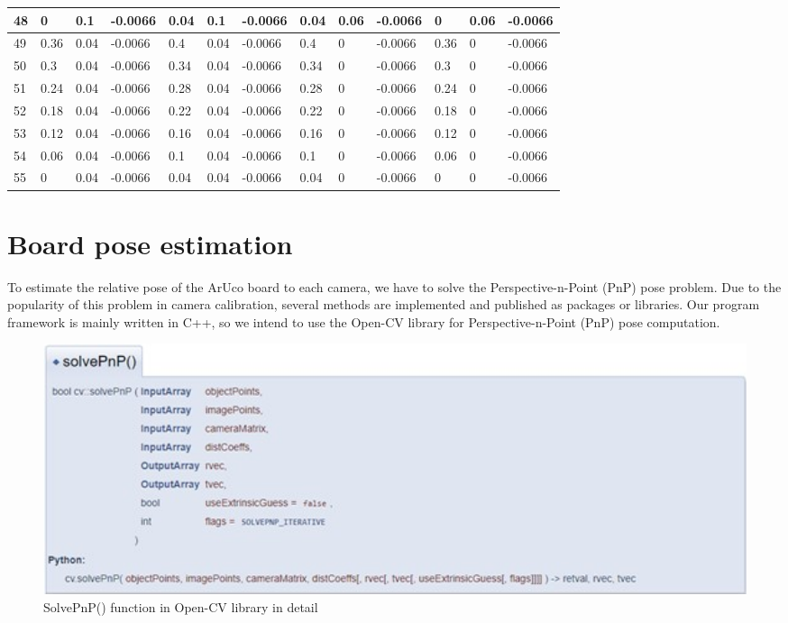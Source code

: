 \begin{footnotesize}
\begin{longtable}{|l|l|l|l|l|l|l|l|l|l|l|l|l|}
48  & 0    & 0.1  & -0.0066 & 0.04 & 0.1  & -0.0066 & 0.04 & 0.06 & -0.0066 & 0    & 0.06 & -0.0066 \\ \hline
49  & 0.36 & 0.04 & -0.0066 & 0.4  & 0.04 & -0.0066 & 0.4  & 0    & -0.0066 & 0.36 & 0    & -0.0066 \\ \hline
50  & 0.3  & 0.04 & -0.0066 & 0.34 & 0.04 & -0.0066 & 0.34 & 0    & -0.0066 & 0.3  & 0    & -0.0066 \\ \hline
51  & 0.24 & 0.04 & -0.0066 & 0.28 & 0.04 & -0.0066 & 0.28 & 0    & -0.0066 & 0.24 & 0    & -0.0066 \\ \hline
52  & 0.18 & 0.04 & -0.0066 & 0.22 & 0.04 & -0.0066 & 0.22 & 0    & -0.0066 & 0.18 & 0    & -0.0066 \\ \hline
53  & 0.12 & 0.04 & -0.0066 & 0.16 & 0.04 & -0.0066 & 0.16 & 0    & -0.0066 & 0.12 & 0    & -0.0066 \\ \hline
54  & 0.06 & 0.04 & -0.0066 & 0.1  & 0.04 & -0.0066 & 0.1  & 0    & -0.0066 & 0.06 & 0    & -0.0066 \\ \hline
55  & 0    & 0.04 & -0.0066 & 0.04 & 0.04 & -0.0066 & 0.04 & 0    & -0.0066 & 0    & 0    & -0.0066 \\ \hline
\end{longtable}
\end{footnotesize}

\clearpage
\section{Board pose estimation}
To estimate the relative pose of the ArUco board to each camera, we have to solve the Perspective-n-Point (PnP) pose problem. Due to the popularity of this problem in camera calibration, several methods are implemented and published as packages or libraries. Our program framework is mainly written in C++, so we intend to use the Open-CV library for Perspective-n-Point (PnP) pose computation.

\begin{figure}[ht]
\centering
\includegraphics[width=1\textwidth]{Images/solvePnP().jpg}
\caption{SolvePnP() function in Open-CV library in detail}
\end{figure}

